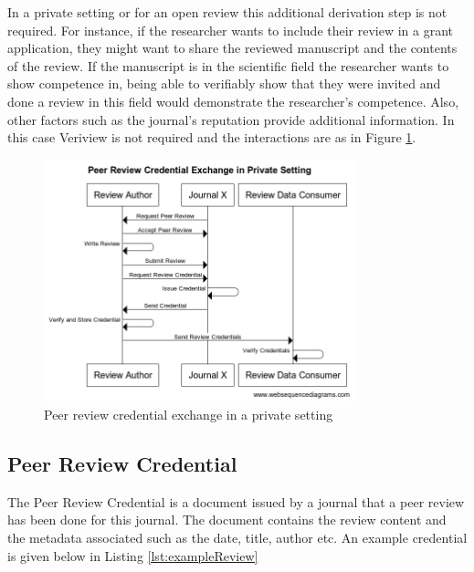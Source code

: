 In a private setting or for an open review this additional derivation step is not required. For instance, if the researcher wants to include their review in a grant application, they might want to share the reviewed manuscript and the contents of the review. If the manuscript is in the scientific field the researcher wants to show competence in, being able to verifiably show that they were invited and done a review in this field  would demonstrate the researcher's competence. Also, other factors such as the journal's reputation provide additional information. In this case Veriview is not required and the interactions are as in Figure \ref{fig:sequencePrivate}.

\begin{figure}[htpb]
  \centering
  \includegraphics[width=0.8\textwidth]{figures/sequencePrivate.png}
  \caption{Peer review credential exchange in a private setting} \label{fig:sequencePrivate}
\end{figure}

\subsection{Peer Review Credential}

The Peer Review Credential is a document issued by a journal that a peer review has been done for this journal. The document contains the review content and the metadata associated such as the date, title, author etc. An example credential is given below in Listing \ref{lst:exampleReview}



